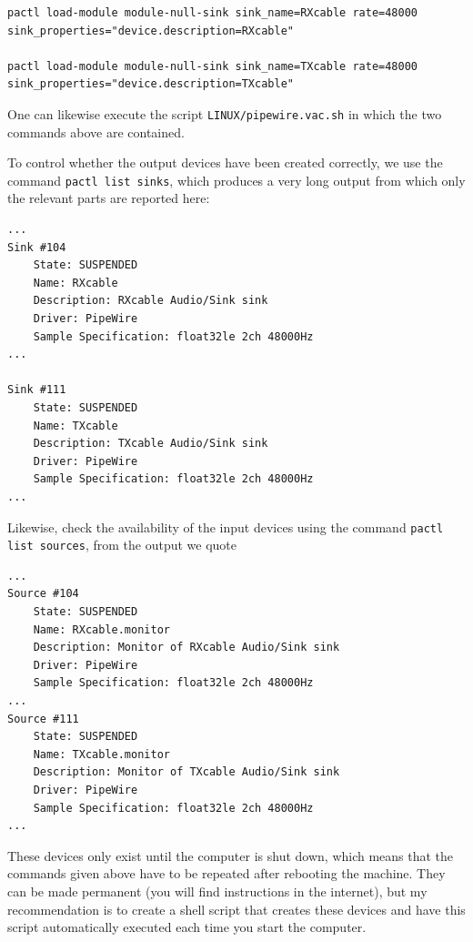 \documentclass[12pt]{book}
\def\grtt#1{\texttt{\color{magenta}#1}}
\begin{document}
\newpage
{\color{magenta}
\begin{verbatim}
pactl load-module module-null-sink sink_name=RXcable rate=48000
sink_properties="device.description=RXcable"

pactl load-module module-null-sink sink_name=TXcable rate=48000
sink_properties="device.description=TXcable"
\end{verbatim}
}

One can likewise execute the script
\texttt{LINUX/pipewire.vac.sh} in which the two commands above are contained.

To control whether the output devices have been created correctly, we use the command
\grtt{pactl list sinks}, which produces
a very long output from which only the relevant parts are reported here:

\begin{small}
\begin{verbatim}
...
Sink #104
    State: SUSPENDED
    Name: RXcable
    Description: RXcable Audio/Sink sink
    Driver: PipeWire
    Sample Specification: float32le 2ch 48000Hz
...

Sink #111
    State: SUSPENDED
    Name: TXcable
    Description: TXcable Audio/Sink sink
    Driver: PipeWire
    Sample Specification: float32le 2ch 48000Hz
...
\end{verbatim}
\end{small}

Likewise, check the availability of the input devices using
the command \grtt{pactl list sources}, from the output we quote

\begin{small}
\begin{verbatim}
...
Source #104
    State: SUSPENDED
    Name: RXcable.monitor
    Description: Monitor of RXcable Audio/Sink sink
    Driver: PipeWire
    Sample Specification: float32le 2ch 48000Hz
...
Source #111
    State: SUSPENDED
    Name: TXcable.monitor
    Description: Monitor of TXcable Audio/Sink sink
    Driver: PipeWire
    Sample Specification: float32le 2ch 48000Hz
...
\end{verbatim}
\end{small}

These devices only exist until the computer is shut down,
which means that the commands given above have to be repeated after rebooting
the machine. They can be made permanent (you will find
instructions in the internet), but my recommendation is to create a shell script that
creates these devices and have this script automatically executed each time
you start the computer.
\end{document}
